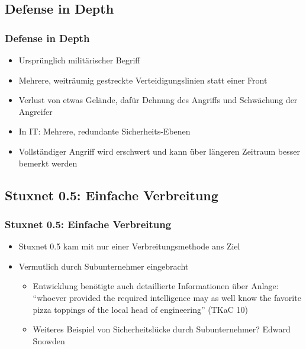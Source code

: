 \documentclass{beamer}
\begin{document}
\subsection{Defense in Depth}

\begin{frame}
  \frametitle{Defense in Depth}
  \begin{itemize}
    \item Ursprünglich militärischer Begriff
    \item Mehrere, weiträumig gestreckte Verteidigungslinien statt einer Front
    \item Verlust von etwas Gelände, dafür Dehnung des Angriffs und Schwächung der Angreifer
    \item In IT: Mehrere, redundante Sicherheits-Ebenen
    \item Vollständiger Angriff wird erschwert und kann über längeren Zeitraum besser bemerkt werden
  \end{itemize}
\end{frame}

\subsection{Stuxnet 0.5: Einfache Verbreitung}

\begin{frame}
  \frametitle{Stuxnet 0.5: Einfache Verbreitung}
  \begin{itemize}
    \item Stuxnet 0.5 kam mit nur einer Verbreitungsmethode ans Ziel
    \item Vermutlich durch Subunternehmer eingebracht
      \begin{itemize}
        \item Entwicklung benötigte auch detaillierte Informationen über Anlage:
          ``whoever provided the required intelligence may as well know the favorite pizza toppings of the local head of engineering'' (TKaC 10)
      \end{itemize}
      \begin{itemize} %
        \item Weiteres Beispiel von Sicherheitslücke durch Subunternehmer? \pause Edward Snowden
      \end{itemize}
  \end{itemize}
\end{frame}
\end{document}
